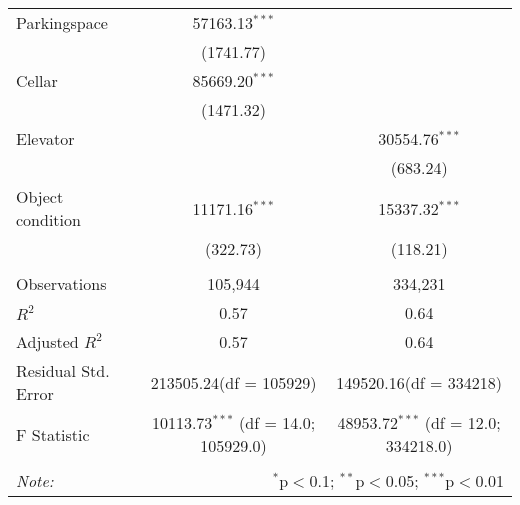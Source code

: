 \begin{table}[!htbp]
\begin{tabular}{@{\extracolsep{5pt}}lcc}
 Parkingspace & 57163.13$^{***}$ & \\
  & (1741.77) & \\
 Cellar & 85669.20$^{***}$ & \\
  & (1471.32) & \\
 Elevator & & 30554.76$^{***}$ \\
  & & (683.24) \\
 Object condition & 11171.16$^{***}$ & 15337.32$^{***}$ \\
  & (322.73) & (118.21) \\
\hline \\[-1.8ex]
 Observations & 105,944 & 334,231 \\
 $R^2$ & 0.57 & 0.64 \\
 Adjusted $R^2$ & 0.57 & 0.64 \\
 Residual Std. Error & 213505.24(df = 105929) & 149520.16(df = 334218)  \\
 F Statistic & 10113.73$^{***}$ (df = 14.0; 105929.0) & 48953.72$^{***}$ (df = 12.0; 334218.0) \\
\hline
\hline \\[-1.8ex]
\textit{Note:} & \multicolumn{2}{r}{$^{*}$p$<$0.1; $^{**}$p$<$0.05; $^{***}$p$<$0.01} \\
\end{tabular}
\end{table}